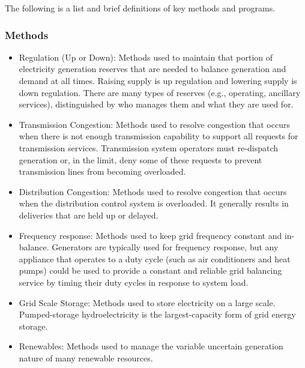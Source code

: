 The following is a list and brief definitions of key methods and programs.  

\subsubsection{Methods}
\begin{itemize}
\item Regulation (Up or Down): Methods used to maintain that portion of electricity generation reserves 
that are needed to balance generation and demand at all times.  Raising supply is up regulation and lowering 
supply is down regulation. There are many types of reserves 
(e.g., operating, ancillary services), distinguished by who manages them and what they are used for.

\item Transmission Congestion: Methods used to resolve congestion that occurs when there is not enough 
transmission capability to support all requests for transmission services. Transmission system operators 
must re-dispatch generation or, 
in the limit, deny some of these requests to prevent transmission lines from becoming overloaded.

\item Distribution Congestion:  Methods used to resolve congestion that occurs when the 
distribution control system 
is overloaded.  It generally results in deliveries that are held up or delayed.  

\item Frequency response:  Methods used to keep grid frequency constant and in-balance. 
Generators are typically used for frequency response, but any appliance that operates to a duty cycle 
(such as air conditioners and heat pumps) could be used to provide a 
constant and reliable grid balancing service by timing their duty cycles in response to system load.   

\item Grid Scale Storage:  Methods used to store electricity on a large scale. 
Pumped-storage hydroelectricity is the largest-capacity form of grid energy storage. 

\item Renewables:  Methods used to manage the variable uncertain generation nature of 
many renewable resources. 
\end{itemize}

